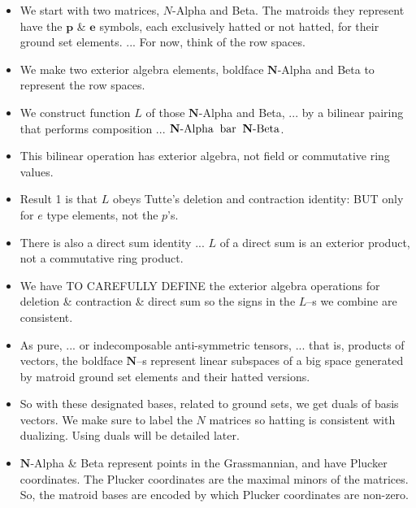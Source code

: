 \documentclass[14pt]{extarticle}
\begin{document}
{\bf
  \begin{itemize}
  \item We start with two matrices, $N$-Alpha and Beta.  The matroids
    they represent have the $\mathbf{p}$ \& $\mathbf{e}$ symbols, each
    exclusively hatted or
    not hatted, for their ground set elements. ...  For now, think of the
    row spaces.

  \item We make two exterior algebra elements,  boldface
    $\mathbf{N}$-Alpha and Beta to represent the row spaces.

  \item We construct function $L$ of those
    $\mathbf{N}$-Alpha and Beta, ... by a bilinear pairing 
    that performs composition ... 
  $\mathbf{N}\text{-Alpha} \text{\;\;bar\;\;} \mathbf{N}\text{-Beta}$.

  \item This bilinear operation has exterior algebra,
    not field or commutative ring values. 

\item Result 1 is that $L$ obeys Tutte's deletion and contraction identity:  BUT
  only for $e$ type elements, not the $p$'s.  

\item There is also a direct sum identity ... $L$ of a direct sum is an exterior product, not
  a commutative ring product.

\item We have TO CAREFULLY DEFINE the exterior algebra operations for deletion \&
  contraction \& direct sum so the signs in the $L$--s we combine are consistent.

\item
  As pure, ... or indecomposable anti-symmetric tensors, ... that is, 
  products of vectors, the boldface
  $\mathbf{N}$--s represent linear subspaces of a big space generated
  by matroid ground set elements and their hatted versions.

\item  So with these designated bases, related to ground sets,
  we get duals of basis vectors.
  We make sure to label the $N$ matrices so hatting is consistent with dualizing.
  Using duals will be detailed later.

\item
  $\mathbf{N}$-Alpha \& Beta represent points in the
  Grassmannian, and have Plucker coordinates.
  The Plucker coordinates are the maximal minors of the matrices.
  So, the matroid bases are encoded by which Plucker coordinates are non-zero.


\end{itemize}}
\end{document}
